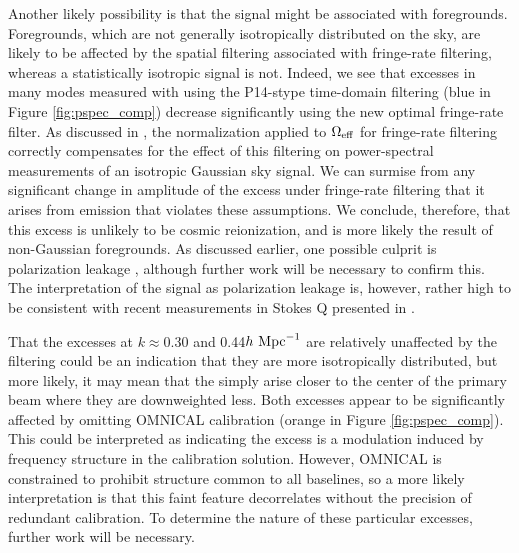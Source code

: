 \documentclass[twocolumn,numberedappendix]{emulateapj} \shorttitle{New Limits on the 21 cm Power Spectrum at $z=8.4$}
\newcommand{\hMpci}{h\ {\rm Mpc}^{-1}}
\begin{document}
Another likely possibility is that the signal might be associated with foregrounds.
Foregrounds, which are not generally isotropically distributed on the sky, are likely
to be affected by the spatial filtering associated with fringe-rate filtering, whereas
a statistically isotropic signal is not.  
Indeed, we see that excesses in many modes
measured with using the P14-stype time-domain filtering (blue in Figure \ref{fig:pspec_comp})
decrease significantly using the new optimal fringe-rate filter.  
As discussed in \citet{parsons_et_al2015},
the normalization applied to $\Omega_{\rm eff}$ for fringe-rate filtering correctly
compensates for the effect of this filtering on power-spectral measurements
of an isotropic Gaussian sky signal.  We can surmise from any significant change in amplitude of the excess
under fringe-rate filtering that it arises from emission that violates these assumptions.
We conclude, therefore, that this excess is unlikely to be cosmic reionization, and is more
likely the result of non-Gaussian foregrounds.
As discussed earlier, one possible
culprit is polarization leakage \citep{moore_et_al2013,jelic_et_al2010,jelic_et_al2014}, although further
work will be necessary to confirm this.  The interpretation of
the signal as polarization leakage is, however, rather high to be consistent with 
recent measurements in Stokes Q presented in \citet{moore_et_al2015}.

That the
excesses at $k\approx0.30$ and 0.44$\hMpci$ are relatively unaffected by the filtering
could be an indication that they are more isotropically distributed, but more likely, it
may mean that the simply arise closer to the center of the primary beam where they are
downweighted less.
Both excesses appear to be significantly affected by omitting OMNICAL calibration
(orange in Figure \ref{fig:pspec_comp}).  This could be interpreted as indicating the 
excess is a modulation induced by frequency structure
in the calibration solution.  However, OMNICAL is constrained
to prohibit structure common to all baselines, so a more likely interpretation is that 
this faint feature decorrelates without the precision of redundant calibration.  To
determine the nature of these particular excesses, further work will be necessary.
\end{document}
